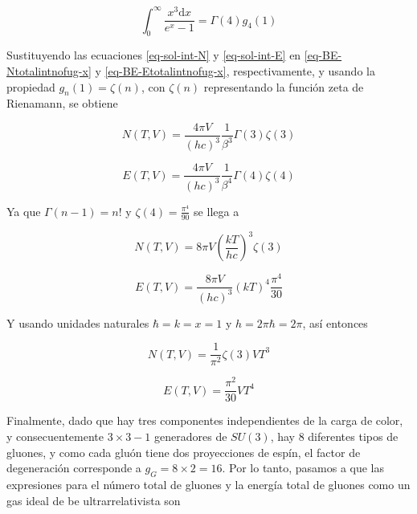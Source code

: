 \begin{equation}\label{eq-sol-int-E}
\int_{0}^{\infty} \frac{{x}^{3} \mathrm{d} x}{ {e}^{x} - 1}= \Gamma(4) {g}_{4}(1)
\end{equation}

Sustituyendo las ecuaciones \eqref{eq-sol-int-N} y \eqref{eq-sol-int-E} en \eqref{eq-BE-Ntotalintnofug-x} y \eqref{eq-BE-Etotalintnofug-x}, respectivamente, y usando la propiedad ${g}_{n}(1) = \zeta(n)$, con $\zeta(n)$ representando la función zeta de Rienamann, se obtiene

\begin{equation}\label{eq-BE-Ntotalintreduced1}
N(T,V) = \frac{4\pi V}{(hc)^{3}} \frac{1}{{\beta}^{3}}\Gamma(3) \zeta(3)
\end{equation}

\begin{equation}\label{eq-BE-Etotalintreduced1}
E(T,V) = \frac{4\pi V}{(hc)^{3}} \frac{1}{{\beta}^{4}} \Gamma(4) \zeta(4)
\end{equation}

Ya que $\Gamma(n-1) = n!$ y $\zeta(4) = \frac{{\pi}^{4}}{90}$ se llega a

 \begin{equation}\label{eq-BE-Ntotalintreduced2}
N(T,V) = 8\pi V \left(\frac{kT}{hc} \right)^{3} \zeta(3)
\end{equation}

\begin{equation}\label{eq-BE-Etotalintreduced2}
E(T,V) = \frac{8\pi V}{(hc)^{3}} \left(k T \right)^{4} \frac{{\pi}^{4}}{30}
\end{equation}

Y usando unidades naturales $\hbar=k=x=1$ y $h=2\pi \hbar = 2\pi$, así entonces

 \begin{equation}\label{eq-BE-Ntotalintreduced3}
N(T,V) = \frac{1}{{\pi}^{2}} \zeta(3)V{T}^{3}
\end{equation}

\begin{equation}\label{eq-BE-Etotalintreduced3}
E(T,V) = \frac{{\pi}^{2}}{30} V{T}^{4}
\end{equation}

Finalmente, dado que hay tres componentes independientes de la carga de color, y consecuentemente $3 \times 3 - 1$ generadores de $SU(3)$, hay 8 diferentes tipos de gluones, y como cada gluón tiene dos proyecciones de espín, el factor de degeneración corresponde a ${g}_{G} = 8 \times 2 = 16$. Por lo tanto, pasamos a que las expresiones para el número total de gluones y la energía total de gluones como un gas ideal de \acrshort{be} ultrarrelativista son

